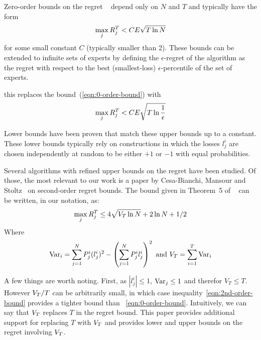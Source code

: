 \documentclass{article}[12pt]
\begin{document}
Zero-order bounds on the regret ~\cite{freund1999adaptive} depend only on $N$
and $T$ and typically have the form
\begin{equation} \label{eqn:0-order-bound}
  \max_j R_j^T < C E \sqrt{T \ln N}
\end{equation}
for some small constant $C$ (typically smaller than 2).
These bounds can be extended to infinite sets of experts by defining
the $\epsilon$-regret of the algorithm as the regret with respect to
the best (smallest-loss) $\epsilon$-percentile of the set of experts.

this replaces the bound~(\ref{eqn:0-order-bound}) with 
\begin{equation} \label{eqn:0-epsilon-order-bound}
  \max_j R_j^T < C E \sqrt{T \ln \frac{1}{\epsilon}}
\end{equation}

Lower bounds have been proven that match these upper bounds up to a
constant. These lower bounds typically rely on constructions in which
the losses $l_j^i$ are chosen independently at random to be either
$+1$ or $-1$ with equal probabilities.



Several algorithms with refined upper bounds on the regret have been
studied. Of those, the most relevant to our work is a paper by 
Cesa-Bianchi, Mansour and
Stoltz~\cite{cesa2007improved} on second-order regret bounds.
The bound given in Theorem~5 of ~\cite{cesa2007improved} can be
written, in our notation, as:
\begin{equation} \label{eqn:2nd-order-bound}
  \max_j R_j^T \leq 4\sqrt{V_T \ln N} +2 \ln N +1/2 
\end{equation}
Where
\[
  \mbox{Var}_i = \sum_{j=1}^N P^i_j (l_j^i)^2 -  \left( \sum_{j=1}^N P^i_j
    l_j^i \right)^2 \mbox{ and } V_T= \sum_{i=1}^T \mbox{Var}_i
\]

A few things are worth noting. First, as $|l_j^i|\leq 1$,
$\mbox{Var}_j\leq 1$ and therefor $V_T\leq T$. However $V_T/T$ can be
arbitrarily small, in which case inequality~\ref{eqn:2nd-order-bound}
provides a tighter bound than ~\ref{eqn:0-order-bound}. Intuitively,
we can say that $V_T$ replaces $T$ in the regret bound. This paper
provides additional support for replacing $T$ with $V_T$ and provides
lower and upper bounds on the regret involving $V_T$.
\end{document}
